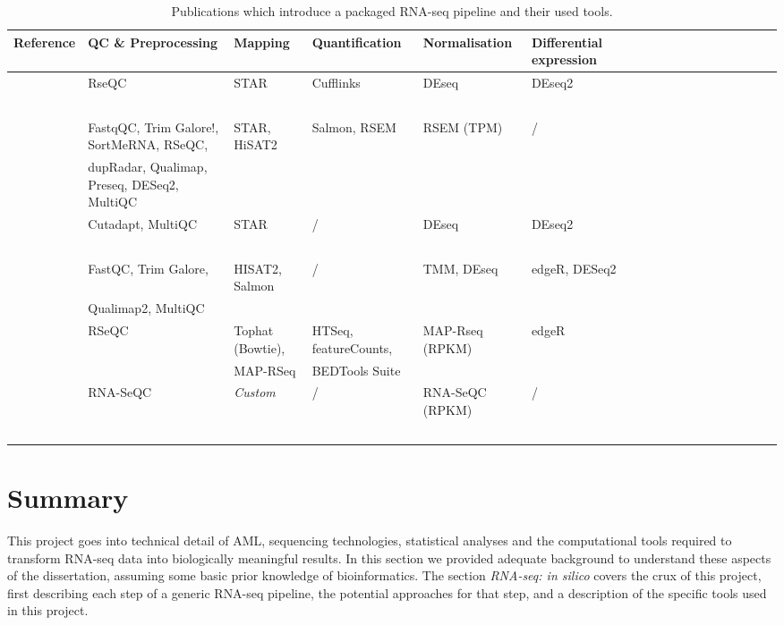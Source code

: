\begin{landscape}
	\pagestyle{empty}
\begin{table}[h]
	\footnotesize
    \centering
    \captionsetup{font=footnotesize}
    \caption{Publications which introduce a packaged RNA-seq pipeline and their used tools.}
	\label{tab:packaged_pipelines}
    \begin{tabular}{llllllllllllllllll}
		\toprule
        \textbf{Reference} & \textbf{QC \& Preprocessing} & \textbf{Mapping} & \textbf{Quantification} & \textbf{Normalisation} &\textbf{ Differential expression} \\ \midrule
        \cite{cornwell2018viper} & RseQC & STAR & Cufflinks &  DEseq & DEseq2  \\ 
        ~ & ~ & ~ & ~ & ~ &   \\ \hline
        \cite{ewels2020nf} & FastqQC, Trim Galore!, SortMeRNA, RSeQC,  & STAR, HiSAT2 & Salmon, RSEM & RSEM (TPM) & /  \\ 
        ~ & dupRadar, Qualimap, Preseq, DESeq2, MultiQC & ~ & ~ & ~ &   \\ \hline
        \cite{koster2021snakemake} & Cutadapt, MultiQC & STAR & / &  DEseq & DEseq2  \\ 
        ~ & ~ & ~ & ~ & ~ &   \\ \hline
        \cite{zhang2020rasflow} & FastQC, Trim Galore,  & HISAT2, Salmon  & / & TMM,  DEseq & edgeR, DESeq2   \\ 
        ~ & Qualimap2, MultiQC  & ~ & ~ & ~ &   \\ \hline
        \cite{kalari2014map} & RSeQC & Tophat (Bowtie),  & HTSeq, featureCounts,  & MAP-Rseq (RPKM) & edgeR  \\ 
        ~ & ~ & MAP-RSeq & BEDTools Suite & ~ &   \\ \hline
        \cite{torres2014prada} & RNA-SeQC  & \textit{Custom} & / & RNA-SeQC (RPKM) & /  \\ 
        ~ & ~ & ~ & ~ & ~ &  \\ \bottomrule
    \end{tabular}
\end{table}
\end{landscape}




\clearpage
\section{Summary}
This project goes into technical detail of \ac{AML}, sequencing technologies, statistical analyses and the computational tools required to transform RNA-seq data into biologically meaningful results. In this section we provided adequate background to understand these aspects of the dissertation, assuming some basic prior knowledge of bioinformatics. The section \textit{RNA-seq: in silico} covers the crux of this project, first describing each step of a generic RNA-seq pipeline, the potential approaches for that step, and a description of the specific tools used in this project.

